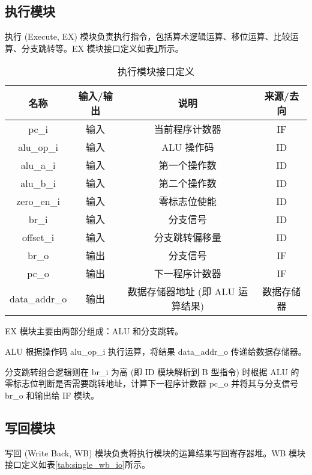 \documentclass[lang=zh]{sjtureport}
\begin{document}
\subsection{执行模块}

执行 (Execute, EX) 模块负责执行指令，包括算术逻辑运算、移位运算、比较运算、分支跳转等。EX 模块接口定义如表\ref{tab:single_ex_io}所示。	

\begin{table}[!htp]
	\centering
	\caption{执行模块接口定义}
	\label{tab:single_ex_io}
	\begin{tabular}{|c|c|c|c|}
		\hline
		名称 & 输入/输出 & 说明 & 来源/去向 \\
		\hline
		pc\_i & 输入 & 当前程序计数器 & IF \\
		\hline
		alu\_op\_i & 输入 & ALU 操作码 & ID \\
		\hline
		alu\_a\_i & 输入 & 第一个操作数 & ID \\
		\hline
		alu\_b\_i & 输入 & 第二个操作数 & ID \\
		\hline
		zero\_en\_i & 输入 & 零标志位使能 & ID \\
		\hline
		br\_i & 输入 & 分支信号 & ID \\
		\hline
		offset\_i & 输入 & 分支跳转偏移量 & ID \\
		\hline
		br\_o & 输出 & 分支信号 & IF \\
		\hline
		pc\_o & 输出 & 下一程序计数器 & IF \\
		\hline
		data\_addr\_o & 输出 & 数据存储器地址 (即 ALU 运算结果) & 数据存储器 \\
		\hline
	\end{tabular}
\end{table}

EX 模块主要由两部分组成：ALU 和分支跳转。

ALU 根据操作码 alu\_op\_i 执行运算，将结果 data\_addr\_o 传递给数据存储器。

分支跳转组合逻辑则在 br\_i 为高 (即 ID 模块解析到 B 型指令) 时根据 ALU 的零标志位判断是否需要跳转地址，计算下一程序计数器 pc\_o 并将其与分支信号 br\_o 和输出给 IF 模块。

\subsection{写回模块}

写回 (Write Back, WB) 模块负责将执行模块的运算结果写回寄存器堆。WB 模块接口定义如表\ref{tab:single_wb_io}所示。
\end{document}
